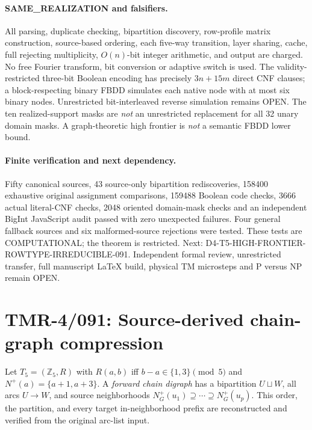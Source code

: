 \documentclass[11pt]{article}
\begin{document}
\paragraph{SAME\_REALIZATION and falsifiers.}
All parsing, duplicate checking, bipartition discovery,
row-profile matrix construction, source-based ordering, each
five-way transition, layer sharing, cache, full rejecting
multiplicity, $O(n)$-bit integer arithmetic, and output are charged.
No free Fourier transform, bit conversion or adaptive switch is used.
The validity-restricted three-bit Boolean encoding has precisely
$3n+15m$ direct CNF clauses; a block-respecting binary FBDD
simulates each native node with at most six binary nodes.
Unrestricted bit-interleaved reverse simulation remains OPEN.
The ten realized-support masks are \emph{not} an unrestricted
replacement for all 32 unary domain masks.
A graph-theoretic high frontier is \emph{not} a semantic
FBDD lower bound.

\paragraph{Finite verification and next dependency.}
Fifty canonical sources, 43 source-only bipartition rediscoveries,
158400 exhaustive original assignment comparisons, 159488 Boolean
code checks, 3666 actual literal-CNF checks, 2048 oriented
domain-mask checks and an independent BigInt JavaScript audit
passed with zero unexpected failures.  Four general fallback
sources and six malformed-source rejections were tested.
These tests are COMPUTATIONAL; the theorem is restricted.
Next: D4-T5-HIGH-FRONTIER-ROWTYPE-IRREDUCIBLE-091.
Independent formal review, unrestricted transfer, full manuscript
\LaTeX{} build, physical TM microsteps and P versus NP remain OPEN.


\section{TMR-4/091: Source-derived chain-graph compression}
\label{sec:tmr4-091}
Let $T_5=(\mathbb Z_5,R)$ with $R(a,b)$ iff
$b-a\in\{1,3\}\pmod 5$ and $N^+(a)=\{a+1,a+3\}$.
A \emph{forward chain digraph} has a bipartition $U\sqcup W$,
all arcs $U\to W$, and source neighborhoods
$N_G^+(u_1)\supseteq\cdots\supseteq N_G^+(u_p)$.
This order, the partition, and every target in-neighborhood prefix
are reconstructed and verified from the original arc-list input.
\end{document}
